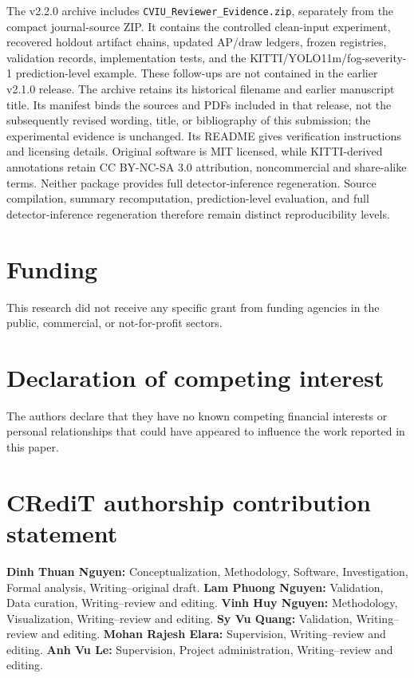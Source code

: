\documentclass[a4paper,fleqn]{cas-dc}
\begin{document}
The v2.2.0 archive includes \nolinkurl{CVIU_Reviewer_Evidence.zip}, separately from the compact journal-source ZIP. It contains the controlled clean-input experiment, recovered holdout artifact chains, updated AP/draw ledgers, frozen registries, validation records, implementation tests, and the KITTI/YOLO11m/fog-severity-1 prediction-level example. These follow-ups are not contained in the earlier v2.1.0 release. The archive retains its historical filename and earlier manuscript title. Its manifest binds the sources and PDFs included in that release, not the subsequently revised wording, title, or bibliography of this submission; the experimental evidence is unchanged. Its README gives verification instructions and licensing details. Original software is MIT licensed, while KITTI-derived annotations retain CC BY-NC-SA 3.0 attribution, noncommercial and share-alike terms. Neither package provides full detector-inference regeneration. Source compilation, summary recomputation, prediction-level evaluation, and full detector-inference regeneration therefore remain distinct reproducibility levels.

\section*{Funding}

This research did not receive any specific grant from funding agencies in the public, commercial, or not-for-profit sectors.

\section*{Declaration of competing interest}

The authors declare that they have no known competing financial interests or personal relationships that could have appeared to influence the work reported in this paper.

\section*{CRediT authorship contribution statement}

\textbf{Dinh Thuan Nguyen:} Conceptualization, Methodology, Software, Investigation, Formal analysis, Writing--original draft. \textbf{Lam Phuong Nguyen:} Validation, Data curation, Writing--review and editing. \textbf{Vinh Huy Nguyen:} Methodology, Visualization, Writing--review and editing. \textbf{Sy Vu Quang:} Validation, Writing--review and editing. \textbf{Mohan Rajesh Elara:} Supervision, Writing--review and editing. \textbf{Anh Vu Le:} Supervision, Project administration, Writing--review and editing.
\end{document}
